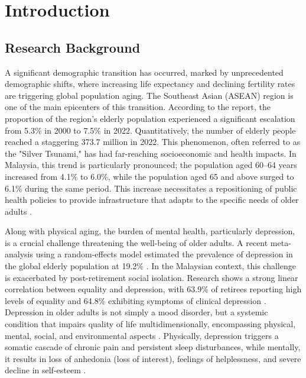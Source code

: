 \chapter{Introduction}
\label{chap:intro}

\section{Research Background}
A significant demographic transition has occurred, marked by unprecedented demographic shifts, where increasing life expectancy and declining fertility rates are triggering global population aging. The Southeast Asian (ASEAN) region is one of the main epicenters of this transition. According to the \cite{ASEANstats2023} report, the proportion of the region's elderly population experienced a significant escalation from 5.3\% in 2000 to 7.5\% in 2022. Quantitatively, the number of elderly people reached a staggering 373.7 million in 2022. This phenomenon, often referred to as the "Silver Tsunami," has had far-reaching socioeconomic and health impacts. In Malaysia, this trend is particularly pronounced; the population aged 60–64 years increased from 4.1\% to 6.0\%, while the population aged 65 and above surged to 6.1\% during the same period. This increase necessitates a repositioning of public health policies to provide infrastructure that adapts to the specific needs of older adults \cite{ASEANstats2023}.

Along with physical aging, the burden of mental health, particularly depression, is a crucial challenge threatening the well-being of older adults. A recent meta-analysis using a random-effects model estimated the prevalence of depression in the global elderly population at 19.2\% \cite{Jalali2024}. In the Malaysian context, this challenge is exacerbated by post-retirement social isolation. Research shows a strong linear correlation between equality and depression, with 63.9\% of retirees reporting high levels of equality and 64.8\% exhibiting symptoms of clinical depression \cite{Subramaniam2024}. Depression in older adults is not simply a mood disorder, but a systemic condition that impairs quality of life multidimensionally, encompassing physical, mental, social, and environmental aspects \cite{Park2022}. Physically, depression triggers a somatic cascade of chronic pain and persistent sleep disturbances, while mentally, it results in loss of anhedonia (loss of interest), feelings of helplessness, and severe decline in self-esteem \cite{Wroblewska2021}.

